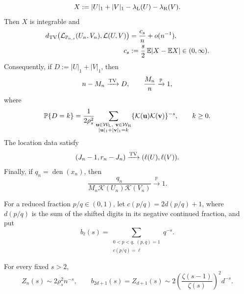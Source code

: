 \begin{theorem}
\begin{equation}
 X:=|U|_1+|V|_1-\lambda_{\rm L}(U)-\lambda_{\rm R}(V).
 \label{eq:context-first-order-variable}
\end{equation}
Then \(X\) is integrable and
\begin{align}
 d_{\rm TV}\bigl(\mathcal L_{\mathbb P_{n,s}}(U_n,V_n),
                   \mathcal L(U,V)\bigr)
 &=\frac{c_s}{n}+o(n^{-1}),\notag\\
 c_s&:=\frac{s}{2}\,\mathbb{E}|X-\mathbb{E} X|\in(0,\infty).
 \label{eq:sharp-brocot-context-tv}
\end{align}
Consequently, if \(D:=|U|_1+|V|_1\), then
\begin{equation}
 n-M_n\xrightarrow{\rm TV}D,
 \qquad
 \frac{M_n}{n}\xrightarrow{\mathbb P}1,
 \label{eq:brocot-defect-limit}
\end{equation}
where
\begin{equation}
 \mathbb P\{D=k\}
 =\frac1{2\rho_s^2}
 \sum_{\substack{\mathbf u\in\mathcal W_{\rm L},\
                   \mathbf v\in\mathcal W_{\rm R}\\
                   |\mathbf u|_1+|\mathbf v|_1=k}}
 \{\mathcal K(\mathbf u)\mathcal K(\mathbf v)\}^{-s},
 \qquad k\ge0.
 \label{eq:brocot-defect-law}
\end{equation}
The location data satisfy
\begin{equation}
 (J_n-1,r_n-J_n)\xrightarrow{\rm TV}
 (\ell(U),\ell(V)).
 \label{eq:brocot-location-limit}
\end{equation}
Finally, if \(q_n=\operatorname{den}(x_n)\), then
\begin{equation}
 \frac{q_n}{M_n\mathcal K(U_n)\mathcal K(V_n)}
 \xrightarrow{\mathbb P}1.
 \label{eq:brocot-denominator-ratio}
\end{equation}
\end{theorem}

For a reduced fraction \(p/q\in(0,1)\), let \(c(p/q)=2d(p/q)+1\), where
\(d(p/q)\) is the sum of the shifted digits in its negative continued
fraction, and put
\[
 b_\ell(s)=\sum_{\substack{0<p<q,\ (p,q)=1\\c(p/q)=\ell}}q^{-s}.
\]

\begin{corollary}
\label{thm:arithmetic-denominator-layer}
For every fixed \(s>2\),
\begin{equation}
 Z_n(s)\sim2\rho_s^2n^{-s},
 \qquad
 b_{2d+1}(s)=Z_{d+1}(s)
 \sim2\left(\frac{\zeta(s-1)}{\zeta(s)}\right)^2d^{-s}.
 \label{eq:low-temperature-local-layer}
\end{equation}
\end{corollary}

